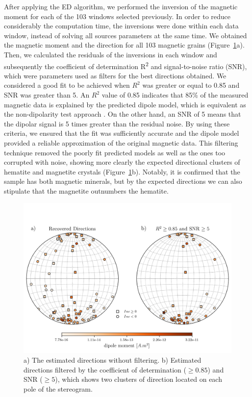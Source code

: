 After applying the ED algorithm, we performed the inversion of the magnetic moment for each of the 103 windows selected previously. In order to reduce considerably the computation time, the inversions were done within each data window, instead of solving all sources parameters at the same time. We obtained the magnetic moment and the direction for all 103 magnetic grains (Figure~\ref{real-data-stereograms}a). Then, we calculated the residuals of the inversions in each window and subsequently the coefficient of determination R\textsuperscript{2} and signal-to-noise ratio (SNR), which were parameters used as filters for the best directions obtained. We considered a good fit to be achieved when $R^2$ was greater or equal to 0.85 and SNR was greater than 5. An $R^2$ value of 0.85 indicates that 85\% of the measured magnetic data is explained by the predicted dipole model, which is equivalent as the non-dipolarity test approach \citep{Fu2020}. On the other hand, an SNR of 5 means that the dipolar signal is 5 times greater than the residual noise. By using these criteria, we ensured that the fit was sufficiently accurate and the dipole model provided a reliable approximation of the original magnetic data. This filtering technique removed the poorly fit predicted models as well as the ones too corrupted with noise, showing more clearly the expected directional clusters of hematite and magnetite crystals (Figure~\ref{real-data-stereograms}b). Notably, it is confirmed that the sample has both magnetic minerals, but by the expected directions we can also stipulate that the magnetite outnumbers the hematite.

\begin{figure}[tb]
\centering
\includegraphics[width=1\linewidth]{figures/real-data-stereograms.png}
\caption{
a) The estimated directions without filtering. b) Estimated directions filtered by the coefficient of determination ($\geq 0.85$) and SNR ($\geq 5$), which shows two clusters of direction located on each pole of the stereogram.
}
\label{real-data-stereograms}
\end{figure}

